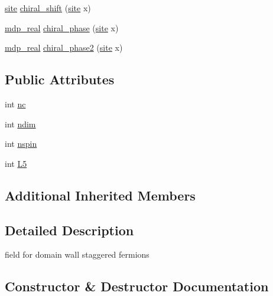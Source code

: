 \begin{DoxyCompactItemize}
\item 
\hyperlink{mdp__compatibility__macros_8h_aa6f1179c424e48adef1cedf7c436eb75}{site} \hyperlink{classsdwf__field_a5cff8766c1891c6240c97d17c6bb63b9}{chiral\+\_\+shift} (\hyperlink{mdp__compatibility__macros_8h_aa6f1179c424e48adef1cedf7c436eb75}{site} x)
\item 
\hyperlink{mdp__global__vars_8h_a69d96b74c791e0bbdb888b3913a69450}{mdp\+\_\+real} \hyperlink{classsdwf__field_a29fce204e377b7a190455e4faf0a2a0c}{chiral\+\_\+phase} (\hyperlink{mdp__compatibility__macros_8h_aa6f1179c424e48adef1cedf7c436eb75}{site} x)
\item 
\hyperlink{mdp__global__vars_8h_a69d96b74c791e0bbdb888b3913a69450}{mdp\+\_\+real} \hyperlink{classsdwf__field_a67fe2a75323e3dcfce3675cce0bbb312}{chiral\+\_\+phase2} (\hyperlink{mdp__compatibility__macros_8h_aa6f1179c424e48adef1cedf7c436eb75}{site} x)
\end{DoxyCompactItemize}
\subsection*{Public Attributes}
\begin{DoxyCompactItemize}
\item 
int \hyperlink{classsdwf__field_a957d5e1caa928243ec4224cf1e2861f1}{nc}
\item 
int \hyperlink{classsdwf__field_a5a861ccb2b42b333b5d67e3b501e8533}{ndim}
\item 
int \hyperlink{classsdwf__field_a6269e653489fd6ee9340da498187b132}{nspin}
\item 
int \hyperlink{classsdwf__field_a19bd0e3027574c1204f8aa3f6635d1df}{L5}
\end{DoxyCompactItemize}
\subsection*{Additional Inherited Members}


\subsection{Detailed Description}
field for domain wall staggered fermions 

\subsection{Constructor \& Destructor Documentation}
\mbox{\label{classsdwf__field_a904cdf6c1f542aa5d4873b5c049a0de5}} 
